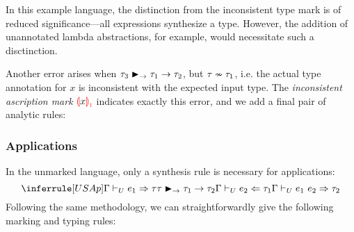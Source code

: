 In this example language, the distinction from the inconsistent type mark is of reduced
significance---all expressions synthesize a type. However, the addition of unannotated lambda
abstractions, for example, would necessitate such a disctinction.

Another error arises when $\matchedArrow{\TMV_3}{\TMV_1}{\TMV_2}$, but
$\inconsistent{\TMV}{\TMV_1}$, i.e. the actual type annotation for $x$ is inconsistent with the
expected input type. The \emph{inconsistent ascription mark} $\ECInconAsc{x}$ indicates exactly this
error, and we add a final pair of analytic rules:
%
\begin{mathpar}

\end{mathpar}

\subsubsection{Applications}
\label{sec:calculus-applications}

In the unmarked language, only a synthesis rule is necessary for applications:
\[%
  \judgment{
    \ctxSynTypeU{\ctx}{\EMV_1}{\TMV} \\
    \matchedArrow{\TMV}{\TMV_1}{\TMV_2} \\
    \ctxAnaTypeU{\ctx}{\EMV_2}{\TMV_1}
  }{
    \ctxSynTypeU{\ctx}{\EAp{\EMV_1}{\EMV_2}}{\TMV_2}
  }{USAp}
\]%
Following the same methodology, we can straightforwardly give the following marking and typing
rules:
%
\begin{mathpar}

\end{mathpar}

